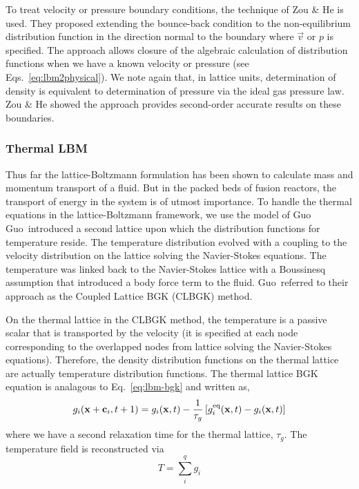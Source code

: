 To treat velocity or pressure boundary conditions, the technique of Zou \& He is used.\cite{Zou1997} They proposed extending the bounce-back condition to the non-equilibrium distribution function in the direction normal to the boundary where $\vec{v}$ or $p$ is specified. The approach allows closure of the algebraic calculation of distribution functions when we have a known velocity or pressure (see Eqs.~\ref{eq:lbm2physical}). We note again that, in lattice units, determination of density is equivalent to determination of pressure via the ideal gas pressure law. Zou \& He showed the approach provides second-order accurate results on these boundaries.\cite{Zou1997} 












\subsubsection{Thermal LBM}

Thus far the lattice-Boltzmann formulation has been shown to calculate mass and momentum transport of a fluid. But in the packed beds of fusion reactors, the transport of energy in the system is of utmost importance. To handle the thermal equations in the lattice-Boltzmann framework, we use the model of Guo\etal\cite{Guo2002} Guo\etal~introduced a second lattice upon which the distribution functions for temperature reside. The temperature distribution evolved with a coupling to the velocity distribution on the lattice solving the Navier-Stokes equations. The temperature was linked back to the Navier-Stokes lattice with a Boussinesq assumption that introduced a body force term to the fluid.\cite{Guo2002} Guo\etal~referred to their approach as the Coupled Lattice BGK (CLBGK) method. 

On the thermal lattice in the CLBGK method, the temperature is a passive scalar that is transported by the velocity (it is specified at each node corresponding to the overlapped nodes from lattice solving the Navier-Stokes equations). Therefore, the density distribution functions on the thermal lattice are actually temperature distribution functions. The thermal lattice BGK equation is analagous to Eq.~\ref{eq:lbm-bgk} and written as,
\begin{equation}\label{eq:lbm-thermal-bgk}
	g_i(\mathbf{x}+\mathbf{c}_i, t + 1) = g_i(\mathbf{x},t) - \frac{1}{\tau_g}\left[g_i^{\text{eq}}(\mathbf{x},t) - g_i(\mathbf{x},t)\right]
\end{equation}
where we have a second relaxation time for the thermal lattice, $\tau_g$. The temperature field is reconstructed via
\begin{equation}
	T = \sum_i^q g_i
\end{equation}

